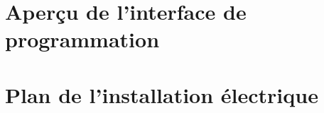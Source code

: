 \documentclass[a4paper, 12pt]{article}
\begin{document}
\begin{appendix}
\section{Aperçu de l'interface de programmation}
\label{appendix:d}

\begin{landscape}

\end{landscape}

\section{Plan de l'installation électrique}
\label{appendix:e}

\begin{landscape}

\end{landscape}

\end{appendix}
\end{document}
